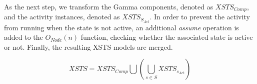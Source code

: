 As the next step, we transform the Gamma components, denoted as \( \mathit{XSTS_{Comp}} \), and the activity instances, denoted as \( \mathit{XSTS_{S_{Act}}} \). In order to prevent the activity from running when the state is not active, an additional \emph{assume} operation is added to the \(O_\mathit{Node}(n)\) function, checking whether the associated state is active or not. Finally, the resulting XSTS models are merged.

\begin{equation*}
	XSTS = \mathit{XSTS_{Comp}} \bigcup \left( \bigcup_{s \in S} \mathit{XSTS_{s_{Act}}} \right)
\end{equation*}
